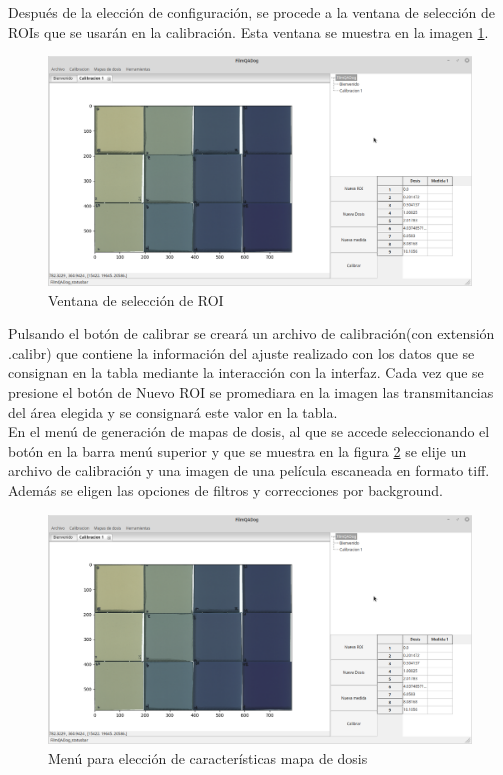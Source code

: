 Después de la elección de configuración, se procede a la ventana de selección de ROIs que se usarán en la calibración. Esta ventana se muestra en la imagen \ref{fig:menuEleccionDosis}.
\begin{figure}[H]
	\centering
	\includegraphics[width=0.7\linewidth]{images/imagenesDocumentacion/menuEleccionDosis.png}
	\caption{Ventana de selección de ROI }
	\label{fig:menuEleccionDosis}
\end{figure}
Pulsando el botón de calibrar se creará un archivo de calibración(con extensión .calibr) que contiene la información del ajuste realizado con los datos que se consignan en la tabla mediante la interacción con la interfaz. Cada vez que se presione el botón de Nuevo ROI se promediara en la imagen las transmitancias del área elegida y se consignará este valor en la tabla.\\

En el menú de generación de mapas de dosis, al que se accede seleccionando el botón en la barra menú superior y que se muestra en la figura \ref{fig:menuMapaDosis} se elije un archivo de calibración y una imagen de una película escaneada en formato tiff. Además se eligen las opciones de filtros y correcciones por background.\\
\begin{figure}[H]
	\centering
	\includegraphics[width=0.7\linewidth]{images/imagenesDocumentacion/menuEleccionDosis.png}
	\caption{Menú para elección de características mapa de dosis }
	\label{fig:menuMapaDosis}
\end{figure}

